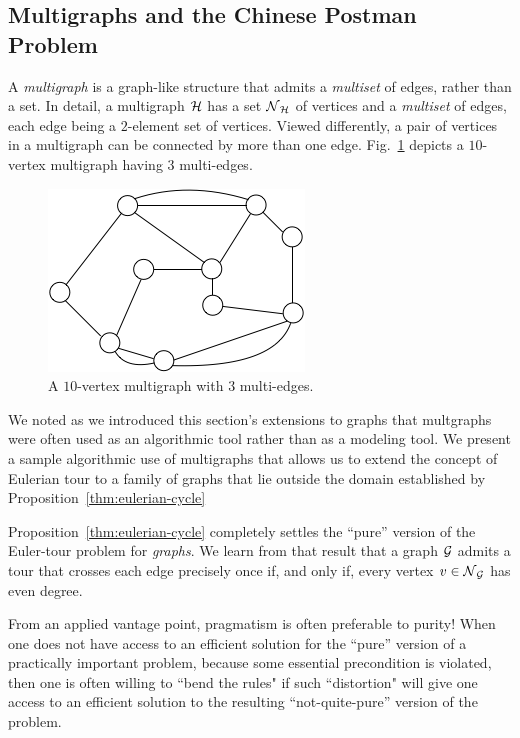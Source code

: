 \subsection{Multigraphs and the Chinese Postman Problem}
\label{sec:multigraphs}
 

A {\it multigraph} is a graph-like structure that admits a {\em multiset} of edges, rather than a set.  In detail, a multigraph $\mbox{$\cal H$}$ has a set $\mbox{$\cal N$}_{\mbox{{\scriptsize $\cal H$}}}$ of vertices and a {\em multiset} of edges, each edge being a $2$-element set of vertices.  Viewed differently, a pair of vertices in a multigraph can be connected by more than one edge.  Fig.~\ref{fig:EulerianFinal} depicts a $10$-vertex multigraph
having $3$ multi-edges.
\begin{figure}[hbt]
\begin{center}
       \includegraphics[scale=0.4]{FiguresGraph/EulerienFinal}
       \caption{A $10$-vertex multigraph with $3$ multi-edges.}
              \label{fig:EulerianFinal}
\end{center}
\end{figure}

\smallskip

We noted as we introduced this section's extensions to graphs that multgraphs were often used as an algorithmic tool rather than as a modeling tool.  We present a sample algorithmic use of multigraphs that allows us to extend the concept of Eulerian tour to a family of graphs that lie outside the domain established by Proposition~\ref{thm:eulerian-cycle}


\bigskip

Proposition~\ref{thm:eulerian-cycle} completely settles the ``pure'' version of the Euler-tour problem for {\em graphs}.  We learn from that result that a graph $\mbox{$\cal G$}$ admits a tour that crosses each edge precisely once if, and only if, every vertex $v \in \mbox{$\cal N$}_{\mbox{{\scriptsize $\cal G$}}}$ has even degree.

\medskip

From an applied vantage point, pragmatism is often preferable to purity!  When one does not have access to an efficient solution for the ``pure'' version of a practically important problem, because some essential precondition is violated, then one is often willing to ``bend the rules" if such ``distortion" will give one access to an efficient solution to the resulting ``not-quite-pure'' version of the problem. 

